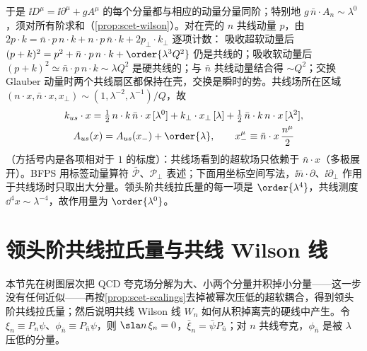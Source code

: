 于是 $\ii D^\mu=\ii\partial^\mu+gA^\mu$ 的每个分量都与相应的动量分量同阶；特别地 $g\,\bar n\cdot A_n\sim\lambda^0$，须对所有阶求和（\cref{prop:scet-wilson}）。对在壳的 $n$ 共线动量 $p$，由 $2p\cdot k=\bar n\cdot p\,n\cdot k+n\cdot p\,\bar n\cdot k+2p_\perp\cdot k_\perp$ 逐项计数：%
吸收超软动量后 $(p+k)^2=p^2+\bar n\cdot p\,n\cdot k+\order{\lambda^3Q^2}$ 仍是共线的；吸收软动量后 $(p+k)^2\simeq\bar n\cdot p\,n\cdot k\sim\lambda Q^2$ 是硬共线的；与 $\bar n$ 共线动量结合得 $\sim Q^2$；交换 Glauber 动量时两个共线扇区都保持在壳，交换是瞬时的势。共线场所在区域 $(n\cdot x,\bar n\cdot x,x_\perp)\sim(1,\lambda^{-2},\lambda^{-1})/Q$，故
\begin{equation}\label{eq:scet-multipole}
\begin{gathered}
k_{us}\cdot x=\tfrac12\,n\cdot k\,\bar n\cdot x\,[\lambda^0]+k_\perp\cdot x_\perp\,[\lambda]+\tfrac12\,\bar n\cdot k\,n\cdot x\,[\lambda^2],\\
A_{us}(x)=A_{us}(x_-)+\order{\lambda},\qquad x_-^\mu\equiv\bar n\cdot x\,\frac{n^\mu}{2}
\end{gathered}
\end{equation}
（方括号内是各项相对于 $1$ 的标度）：共线场看到的超软场只依赖于 $\bar n\cdot x$（多极展开）。BFPS 用标签动量算符 $\bar{\mathcal P}$、$\mathcal P_\perp$ 表述\cite{BauerEtAl2001,BauerStewart2001}；下面用坐标空间写法\cite{BenekeEtAl2002,Beneke:2002ni}，$\ii\bar n\cdot\partial$、$\ii\partial_\perp$ 作用于共线场时只取出大分量。领头阶共线拉氏量的每一项是 $\order{\lambda^4}$，共线测度 $\dd^4x\sim\lambda^{-4}$，故作用量为 $\order{\lambda^0}$。

\section{领头阶共线拉氏量与共线 Wilson 线}\label{sec:scet-lagrangian}

本节先在树图层次把 QCD 夸克场分解为大、小两个分量并积掉小分量——这一步没有任何近似——再按\cref{prop:scet-scalings}去掉被幂次压低的超软耦合，得到领头阶共线拉氏量；然后说明共线 Wilson 线 $W_n$ 如何从积掉离壳的硬线中产生。令 $\xi_n\equiv P_n\psi$、$\phi_{\bar n}\equiv P_{\bar n}\psi$，则 $\sla n\,\xi_n=0$，$\bar\xi_n=\bar\psi P_{\bar n}$；对 $n$ 共线夸克，$\phi_{\bar n}$ 是被 $\lambda$ 压低的分量。


